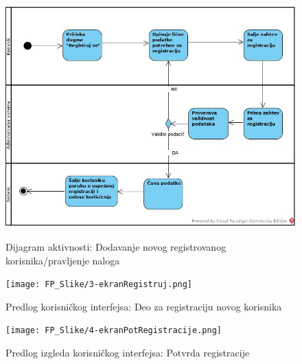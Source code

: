 \documentclass[20pt]{article}
\begin{document}
\begin{figure}[h]
        \centering
        \includegraphics[width=1.1\textwidth,height=0.74\textheight]{Pictures/DodavanjeNovogRegistrovanogKorisnika.jpg}\\
        \caption{Dijagram aktivnosti: Dodavanje novog registrovanog korisnika/pravljenje naloga}
        \label{fig:dijagramAktivnostiDodavanjeKorisnika}
    \end{figure}
\newpage

\begin{figure}[h]
        \centering
        \texttt{[image: FP\_Slike/3-ekranRegistruj.png]}\\
        \caption{Predlog korisni\v ckog interfejsa: Deo za registraciju novog korisnika}
   \end{figure}
\newpage
\begin{figure}[h]
        \centering
        \texttt{[image: FP\_Slike/4-ekranPotRegistracije.png]}\\
        \caption{Predlog izgleda korisni\v ckog interfejsa: Potvrda registracije}
    \end{figure}

\newpage
\end{document}
